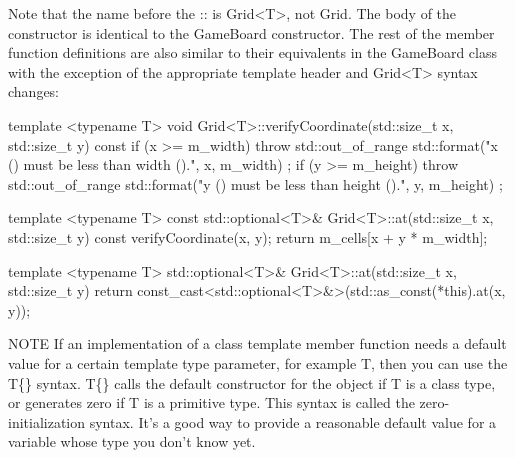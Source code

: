 Note that the name before the :: is Grid<T>, not Grid. The body of the constructor is identical to the GameBoard constructor. The rest of the member function definitions are also similar to their equivalents in the GameBoard class with the exception of the appropriate template header and Grid<T> syntax changes:

\begin{cpp}
template <typename T>
void Grid<T>::verifyCoordinate(std::size_t x, std::size_t y) const
{
    if (x >= m_width) {
        throw std::out_of_range {
            std::format("x ({}) must be less than width ({}).", x, m_width) };
    }
    if (y >= m_height) {
        throw std::out_of_range {
            std::format("y ({}) must be less than height ({}).", y, m_height) };
    }
}

template <typename T>
const std::optional<T>& Grid<T>::at(std::size_t x, std::size_t y) const
{
    verifyCoordinate(x, y);
    return m_cells[x + y * m_width];
}

template <typename T>
std::optional<T>& Grid<T>::at(std::size_t x, std::size_t y)
{
    return const_cast<std::optional<T>&>(std::as_const(*this).at(x, y));
}
\end{cpp}

\begin{myNotic}{NOTE}
If an implementation of a class template member function needs a default value for a certain template type parameter, for example T, then you can use the T\{\} syntax. T\{\} calls the default constructor for the object if T is a class type, or generates zero if T is a primitive type. This syntax is called the zero-initialization syntax. It’s a good way to provide a reasonable default value for a variable whose type you don’t know yet.
\end{myNotic}













